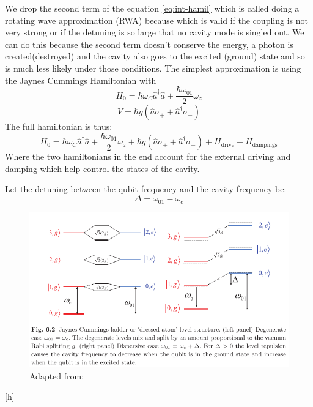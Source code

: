 \documentclass[12pt]{article}
\numberwithin{equation}{subsection}
\newcommand\page[1]{
{
}
}
\begin{document}
We drop the second term of the equation \ref{eq:int-hamil} which is called doing a rotating wave approximation (RWA) because which is valid if the coupling is not very strong or if the detuning is so large  that no cavity mode is singled out. We can do this because the second term doesn't conserve the energy, a photon is created(destroyed) and the cavity also goes to the excited (ground) state and so is much less likely under those conditions.
The simplest approximation is using the Jaynes Cummings Hamiltonian with 
\begin{equation}
    H_0 = \hbar \omega_C\hat a^\dagger \hat a +\frac{\hbar \omega_{01}}{2} \omega_z
\end{equation}
\begin{equation}
    V = \hbar g (\hat a\sigma_++ \hat a^\dagger\sigma_-)
    \label{eq:vjaynes}
\end{equation}
The full hamiltonian is thus:
\begin{equation}
    H_0 = \hbar \omega_C\hat a^\dagger \hat a +\frac{\hbar \omega_{01}}{2} \omega_z + \hbar g (\hat a\sigma_++ \hat a^\dagger\sigma_-) + H_{\textrm{drive}}+ H_{\textrm{dampings}}
\end{equation}
Where the two hamiltonians in the end account for the external driving and damping which help control the states of the cavity.
\page{76/83}
Let the detuning between the qubit frequency and the cavity frequency be:
\begin{equation}
    \Delta = \omega_{01} - \omega_c
\end{equation}
\begin{figure}[h]
\includegraphics[scale=0.5]{images/76-coupling.png}
\caption{Adapted from: \cite{Girvin2015CircuitQS}}
\label{76-coupling}
\end{figure}[h]
\end{document}
